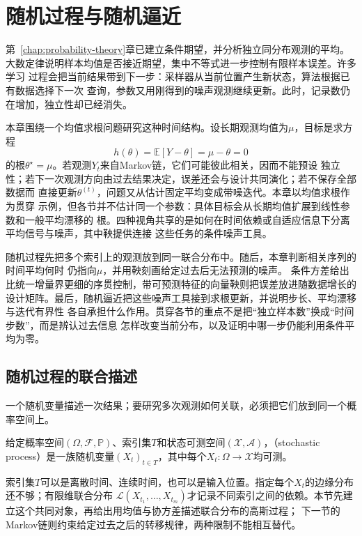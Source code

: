 \chapter{随机过程与随机逼近}
\label{chap:stochastic-processes-and-approximation}

第~\ref{chap:probability-theory}章已建立条件期望，并分析独立同分布观测的平均。
大数定律说明样本均值是否接近期望，集中不等式进一步控制有限样本误差。许多学习
过程会把当前结果带到下一步：采样器从当前位置产生新状态，算法根据已有数据选择下一次
查询，参数又用刚得到的噪声观测继续更新。此时，记录数仍在增加，独立性却已经消失。

本章围绕一个均值求根问题研究这种时间结构。设长期观测均值为$\mu$，目标是求方程
\begin{equation}
  h(\theta)=\mathbb{E}[Y-\theta]=\mu-\theta=0
  \label{eq:stoch-mean-root}
\end{equation}
的根$\theta^\star=\mu$。若观测$Y_t$来自Markov链，它们可能彼此相关，因而不能预设
独立性；若下一次观测方向由过去结果决定，误差还会与设计共同演化；若不保存全部数据而
直接更新$\theta^{(t)}$，问题又从估计固定平均变成带噪迭代。本章以均值求根作为贯穿
示例，但各节并不估计同一个参数：具体目标会从长期均值扩展到线性参数和一般平均漂移的
根。四种视角共享的是如何在时间依赖或自适应信息下分离平均信号与噪声，其中鞅提供连接
这些任务的条件噪声工具。

随机过程先把多个索引上的观测放到同一联合分布中。随后，本章判断相关序列的时间平均何时
仍指向$\mu$，并用鞅刻画给定过去后无法预测的噪声。
条件方差给出比统一增量界更细的序贯控制，带可预测特征的向量鞅则把误差放进随数据增长的
设计矩阵。最后，随机逼近把这些噪声工具接到求根更新，并说明步长、平均漂移与迭代有界性
各自承担什么作用。贯穿各节的重点不是把“独立样本数”换成“时间步数”，而是辨认过去信息
怎样改变当前分布，以及证明中哪一步仍能利用条件平均为零。

\section{随机过程的联合描述}
\label{sec:stoch-process-joint-laws}


一个随机变量描述一次结果；要研究多次观测如何关联，必须把它们放到同一个概率空间上。
\begin{definition}[随机过程]
  \label{def:stoch-process}
  给定概率空间\((\Omega,\mathcal F,\mathbb P)\)、索引集\(T\)和状态可测空间\((\mathcal X,\mathcal A)\)，（stochastic process）是一族随机变量\((X_t)_{t\in T}\)，其中每个\(X_t:\Omega\to\mathcal X\)均可测。
\end{definition}
索引集\(T\)可以是离散时间、连续时间，也可以是输入位置。指定每个\(X_t\)的边缘分布还不够；有限维联合分布
\(\mathcal L(X_{t_1},\ldots,X_{t_m})\)才记录不同索引之间的依赖。本节先建立这个共同对象，再给出用均值与协方差描述联合分布的高斯过程；
下一节的Markov链则约束给定过去之后的转移规律，两种限制不能相互替代。


